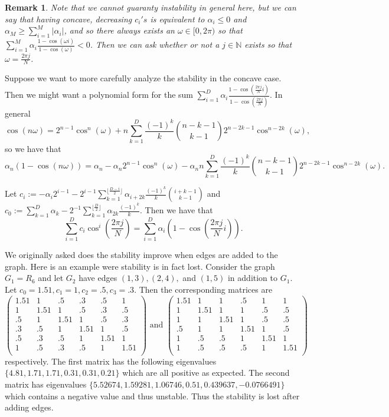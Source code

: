 \documentclass{article}
\newcommand{\N}{\mathbb{N}}
\newtheorem{rmk}[thm]{Remark}
\newcommand{\1}{\mathbf{1}}
\newcommand{\0}{\mathbf{0}}
\begin{document}
\begin{rmk}
Note that we cannot guaranty instability in general here, but we can say that having concave, decreasing $c_i's$ is equivalent to $\alpha_i \leq 0$ and $\alpha_M \geq \sum_{i=1}^M | \alpha_{i} |$, and so there always exists an $\omega \in [0,2 \pi)$ so that $\sum_{i=1}^M \alpha_{i} \frac{1- \cos(\omega i)}{1- \cos(\omega)} < 0$. 
Then we can ask whether or not a $j \in \N$ exists so that $\omega = \frac{2\pi j}{N}$.
\end{rmk}

Suppose we want to more carefully analyze the stability in the concave case.  
Then we might want a polynomial form for the sum $\sum_{i=1}^D \alpha_{i} \frac{1- \cos(\frac{2\pi j}{N} i)}{1- \cos(\frac{2\pi j}{N})}$.  
In general
$$
\cos(n \omega) = 2^{n-1} \cos^n(\omega) + n \sum_{k=1}^D \frac{(-1)^k}{k} {n-k-1\choose k-1} 2^{n-2k-1} \cos^{n-2k} (\omega),
$$
so we have that
$$
\alpha_n(1-\cos(n \omega)) = \alpha_n - \alpha_n 2^{n-1} \cos^n(\omega) - \alpha_n n \sum_{k=1}^D \frac{(-1)^k}{k} {n-k-1\choose k-1} 2^{n-2k-1} \cos^{n-2k} (\omega).
$$

Let $c_i := -\alpha_i 2^{i-1} -  2^{i-1}\sum_{k=1}^{\lfloor \frac{D-i}{2} \rfloor} \alpha_{i+2k} \frac{(-1)^k}{k} {i+k-1\choose k-1}$ 
and $c_0 := \sum_{k=1}^D \alpha_k -  2^{-1}\sum_{k=1}^{\lfloor \frac{D}{2} \rfloor} \alpha_{2k} \frac{(-1)^k}{k}$.  
Then we have that 
$$\sum_{i=1}^D c_i \cos^i\left(\frac{2\pi j}{N}\right) = \sum_{i=1}^D \alpha_{i} {\left(1- \cos \left( \frac{2\pi j}{N} i\right) \right)}.$$

We originally asked does the stability improve when edges are added to the graph.  
Here is an example were stability is in fact lost.  
Consider the graph $G_1 = R_6$ and let $G_2$ have edges $(1,3),(2,4),$ and $(1,5)$ in addition to $G_1$.  
Let $c_0 = 1.51, c_1 = 1, c_2 = .5, c_3 = .3$.
Then the corresponding matrices are
$$
\begin{pmatrix}
1.51 & 1 & .5 & .3 & .5 & 1 \\
1 & 1.51 & 1 & .5 & .3 & .5 \\
.5 & 1 & 1.51 & 1 & .5 & .3 \\
.3 & .5 & 1 & 1.51 & 1 & .5 \\
.5 & .3 & .5 & 1 & 1.51 & 1 \\
1 & .5 & .3 & .5 & 1 & 1.51 \\
\end{pmatrix} 
\mbox{ and }
\begin{pmatrix}
1.51 & 1 & 1 & .5 & 1 & 1 \\
1 & 1.51 & 1 & 1 & .5 & .5 \\
1 & 1 & 1.51 & 1 & .5 & .5 \\
.5 & 1 & 1 & 1.51 & 1 & .5 \\
1 & .5 & .5 & 1 & 1.51 & 1 \\
1 & .5 & .5 & .5 & 1 & 1.51 \\
\end{pmatrix}
$$
respectively.  
The first matrix has the following eigenvalues $\{  4.81,1.71,1.71,0.31,0.31,0.21 \}$ which are all positive as expected.
The second matrix has eigenvalues $\{ 5.52674,1.59281,1.06746,0.51,0.439637,-0.0766491 \}$ which contains a negative value and thus unstable.  
Thus the stability is lost after adding edges.
\end{document}
